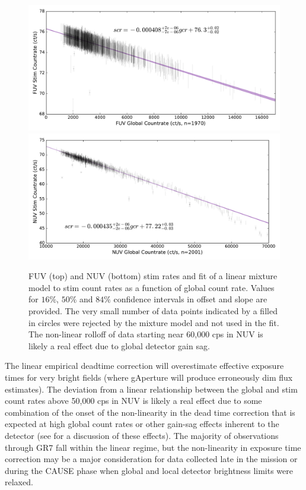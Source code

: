 \documentclass[iop]{emulateapj}
\begin{document}
\begin{figure}[h]
\includegraphics[scale=0.35]{Fig10a.pdf}\\
\includegraphics[scale=0.35]{Fig10b.pdf}
\caption{FUV (top) and NUV (bottom) stim rates and fit of a linear mixture model to stim count rates as a function of global count rate. Values for $16\%$, $50\%$ and $84\%$ confidence intervals in offset and slope are provided. The very small number of data points indicated by a filled in circles were rejected by the mixture model and not used in the fit. The non-linear rolloff of data starting near 60,000 cps in NUV is likely a real effect due to global detector gain sag.
\label{stim}}
\end{figure}

The linear empirical deadtime correction will overestimate effective exposure times for very bright fields (where gAperture will produce erroneously dim flux estimates). The deviation from a linear relationship between the global and stim count rates above 50,000 cps in NUV is likely a real effect due to some combination of the onset of the non-linearity in the dead time correction that is expected at high global count rates or other gain-sag effects inherent to the detector (see \citep{mor2007} for a discussion of these effects). The majority of observations through GR7 fall within the linear regime, but the non-linearity in exposure time correction may be a major consideration for data collected late in the mission or during the CAUSE phase when global and local detector brightness limits were relaxed.
\end{document}
